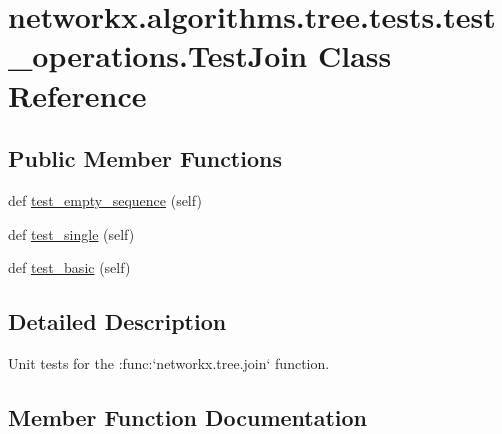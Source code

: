\hypertarget{classnetworkx_1_1algorithms_1_1tree_1_1tests_1_1test__operations_1_1TestJoin}{}\section{networkx.\+algorithms.\+tree.\+tests.\+test\+\_\+operations.\+Test\+Join Class Reference}
\label{classnetworkx_1_1algorithms_1_1tree_1_1tests_1_1test__operations_1_1TestJoin}
\subsection*{Public Member Functions}
\begin{DoxyCompactItemize}
\item 
def \hyperlink{classnetworkx_1_1algorithms_1_1tree_1_1tests_1_1test__operations_1_1TestJoin_a71615819f1ec3e39998dabd4f5088b1d}{test\+\_\+empty\+\_\+sequence} (self)
\item 
def \hyperlink{classnetworkx_1_1algorithms_1_1tree_1_1tests_1_1test__operations_1_1TestJoin_ac923bce2bcd84eff283c5cd089b5d8a2}{test\+\_\+single} (self)
\item 
def \hyperlink{classnetworkx_1_1algorithms_1_1tree_1_1tests_1_1test__operations_1_1TestJoin_a364f96530eefbbb6c338ceac88630f3b}{test\+\_\+basic} (self)
\end{DoxyCompactItemize}


\subsection{Detailed Description}
\begin{DoxyVerb}Unit tests for the :func:`networkx.tree.join` function.\end{DoxyVerb}
 

\subsection{Member Function Documentation}
\mbox{\label{classnetworkx_1_1algorithms_1_1tree_1_1tests_1_1test__operations_1_1TestJoin_a364f96530eefbbb6c338ceac88630f3b}} 
